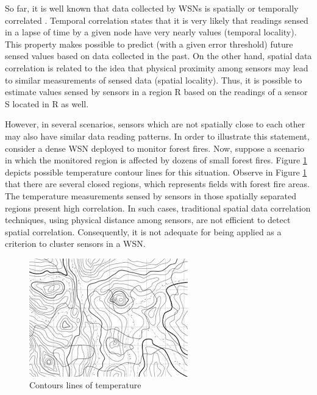 \documentclass{acm_proc_article-sp}
\begin{document}
So far, it is well known that data collected by WSNs is spatially or temporally
correlated \cite{Chu2006, Villas2012, Yoon2005}. Temporal correlation states
that it is very likely that readings sensed in a lapse of time by a given node
have very nearly values (temporal locality). This property makes possible to
predict (with a given error threshold) future sensed values based on data
collected in the past. On the other hand, spatial data correlation is related to
the idea that physical proximity among sensors may lead to similar measurements
of sensed data (spatial locality). Thus, it is possible to estimate values
sensed by sensors in a region R based on the readings of a sensor S located in R
as well.
\vspace*{-.3cm}

However, in several scenarios, sensors which are not spatially close to each
other may also have similar data reading patterns. In order to illustrate this
statement, consider a dense WSN deployed to monitor forest fires.
Now, suppose a scenario in which the monitored region is affected by dozens of
small forest fires. Figure \ref{fig:contour_lines} depicts possible temperature
contour lines for this situation. Observe in Figure \ref{fig:contour_lines} that
there are several closed regions, which represents fields with forest fire areas.
The temperature measurements sensed by sensors in those spatially separated
regions present high correlation. In such cases, traditional spatial data
correlation techniques, using physical distance among sensors, are not efficient
to detect spatial correlation. Consequently, it is not adequate for being
applied as a criterion to cluster sensors in a WSN.

\begin{figure}[!htb]
\centering
	\includegraphics[scale=0.8]{I2.png}
    \caption{Contours lines of temperature}
    \label{fig:contour_lines}
\end{figure}
\vspace*{-.3cm}
\end{document}
